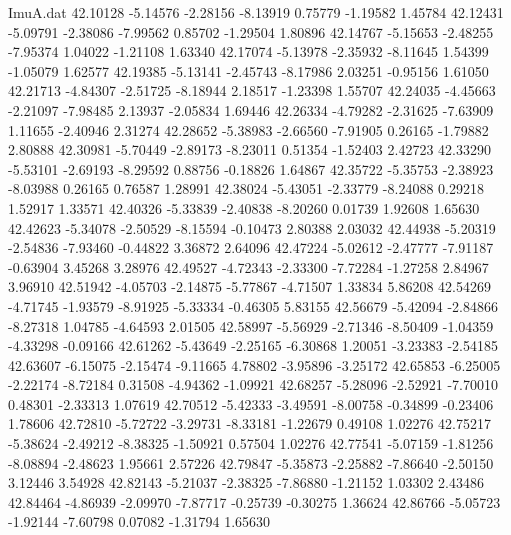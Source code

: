 \begin{filecontents}{ImuA.dat}
  42.10128   -5.14576   -2.28156   -8.13919    0.75779   -1.19582    1.45784
  42.12431   -5.09791   -2.38086   -7.99562    0.85702   -1.29504    1.80896
  42.14767   -5.15653   -2.48255   -7.95374    1.04022   -1.21108    1.63340
  42.17074   -5.13978   -2.35932   -8.11645    1.54399   -1.05079    1.62577
  42.19385   -5.13141   -2.45743   -8.17986    2.03251   -0.95156    1.61050
  42.21713   -4.84307   -2.51725   -8.18944    2.18517   -1.23398    1.55707
  42.24035   -4.45663   -2.21097   -7.98485    2.13937   -2.05834    1.69446
  42.26334   -4.79282   -2.31625   -7.63909    1.11655   -2.40946    2.31274
  42.28652   -5.38983   -2.66560   -7.91905    0.26165   -1.79882    2.80888
  42.30981   -5.70449   -2.89173   -8.23011    0.51354   -1.52403    2.42723
  42.33290   -5.53101   -2.69193   -8.29592    0.88756   -0.18826    1.64867
  42.35722   -5.35753   -2.38923   -8.03988    0.26165    0.76587    1.28991
  42.38024   -5.43051   -2.33779   -8.24088    0.29218    1.52917    1.33571
  42.40326   -5.33839   -2.40838   -8.20260    0.01739    1.92608    1.65630
  42.42623   -5.34078   -2.50529   -8.15594   -0.10473    2.80388    2.03032
  42.44938   -5.20319   -2.54836   -7.93460   -0.44822    3.36872    2.64096
  42.47224   -5.02612   -2.47777   -7.91187   -0.63904    3.45268    3.28976
  42.49527   -4.72343   -2.33300   -7.72284   -1.27258    2.84967    3.96910
  42.51942   -4.05703   -2.14875   -5.77867   -4.71507    1.33834    5.86208
  42.54269   -4.71745   -1.93579   -8.91925   -5.33334   -0.46305    5.83155
  42.56679   -5.42094   -2.84866   -8.27318    1.04785   -4.64593    2.01505
  42.58997   -5.56929   -2.71346   -8.50409   -1.04359   -4.33298   -0.09166
  42.61262   -5.43649   -2.25165   -6.30868    1.20051   -3.23383   -2.54185
  42.63607   -6.15075   -2.15474   -9.11665    4.78802   -3.95896   -3.25172
  42.65853   -6.25005   -2.22174   -8.72184    0.31508   -4.94362   -1.09921
  42.68257   -5.28096   -2.52921   -7.70010    0.48301   -2.33313    1.07619
  42.70512   -5.42333   -3.49591   -8.00758   -0.34899   -0.23406    1.78606
  42.72810   -5.72722   -3.29731   -8.33181   -1.22679    0.49108    1.02276
  42.75217   -5.38624   -2.49212   -8.38325   -1.50921    0.57504    1.02276
  42.77541   -5.07159   -1.81256   -8.08894   -2.48623    1.95661    2.57226
  42.79847   -5.35873   -2.25882   -7.86640   -2.50150    3.12446    3.54928
  42.82143   -5.21037   -2.38325   -7.86880   -1.21152    1.03302    2.43486
  42.84464   -4.86939   -2.09970   -7.87717   -0.25739   -0.30275    1.36624
  42.86766   -5.05723   -1.92144   -7.60798    0.07082   -1.31794    1.65630

\end{filecontents}
